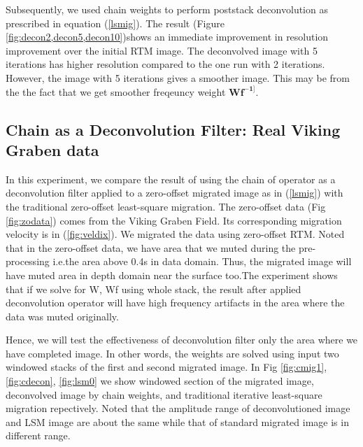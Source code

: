 
%

Subsequently, we used chain weights to perform poststack deconvolution as prescribed in equation (\ref{lsmig}). The result (Figure \ref{fig:decon2,decon5,decon10})shows an immediate improvement in resolution improvement over the initial RTM image. The deconvolved image with 5 iterations has higher resolution compared to the one run with 2 iterations. However, the image with 5 iterations gives a smoother image. This may be from the the fact that we get smoother freqeuncy weight $\mathbf{Wf^{-1]}}$.


%
%

\subsection*{Chain as a Deconvolution Filter: Real Viking Graben data}

In this experiment, we compare the result of using the chain of operator as a deconvolution filter applied to a zero-offset migrated image as in (\ref{lsmig}) with the traditional zero-offset least-square migration. The zero-offset data (Fig \ref{fig:zodata}) comes from the Viking Graben Field. Its corresponding migration velocity is in (\ref{fig:veldix}). We migrated the data using zero-offset RTM. Noted that in the zero-offset data, we have area that we muted during the pre-processing i.e.the area above 0.4s in data domain. Thus, the migrated image will have muted area in depth domain near the surface too.The experiment shows that if we solve for W, Wf using whole stack, the result after applied deconvolution operator will have high frequency artifacts in the area where the data was muted originally.


%
Hence, we will test the effectiveness of deconvolution filter only the area where we have completed image. In other words, the weights are solved using input two windowed stacks of the first and second migrated image. In Fig \ref{fig:cmig1}, \ref{fig:cdecon}, \ref{fig:lsm0} we show windowed section of the migrated image, deconvolved image by chain weights, and traditional iterative least-square migration repectively. Noted that the amplitude range of deconvolutioned image and LSM image are about the same while that of standard migrated image is in different range.  

